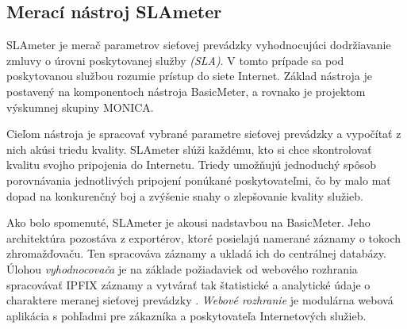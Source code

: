 \subsection{Merací nástroj SLAmeter}

SLAmeter je merač parametrov sieťovej prevádzky vyhodnocujúci dodržiavanie zmluvy o úrovni poskytovanej 
služby \emph{(SLA)}. V tomto prípade sa pod poskytovanou službou rozumie prístup do siete 
Internet. Základ nástroja je postavený na komponentoch nástroja BasicMeter, a rovnako je projektom 
výskumnej skupiny MONICA. 

Cieľom nástroja je spracovať vybrané parametre sieťovej prevádzky a vypočítať z nich akúsi triedu 
kvality. SLAmeter slúži každému, kto si chce skontrolovať kvalitu svojho pripojenia do Internetu. 
Triedy umožňujú jednoduchý spôsob porovnávania jednotlivých pripojení ponúkané poskytovateľmi, 
čo by malo mať dopad na konkurenčný boj a zvýšenie snahy o zlepšovanie kvality služieb. \citep{slameter}

Ako bolo spomenuté, SLAmeter je akousi nadstavbou na BasicMeter. Jeho architektúra pozostáva z exportérov,
ktoré posielajú namerané záznamy o tokoch zhromažďovaču. Ten spracováva záznamy a ukladá ich do 
centrálnej databázy. Úlohou \emph{vyhodnocovača} je na základe požiadaviek od webového rozhrania 
spracovávať IPFIX záznamy a vytvárať tak štatistické a analytické údaje o charaktere 
meranej sieťovej prevádzky \citep{evaluator}. \emph{Webové rozhranie} je modulárna webová aplikácia 
s pohľadmi pre zákazníka a poskytovateľa Internetových služieb.